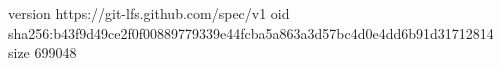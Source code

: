 version https://git-lfs.github.com/spec/v1
oid sha256:b43f9d49ce2f0f00889779339e44fcba5a863a3d57bc4d0e4dd6b91d31712814
size 699048
